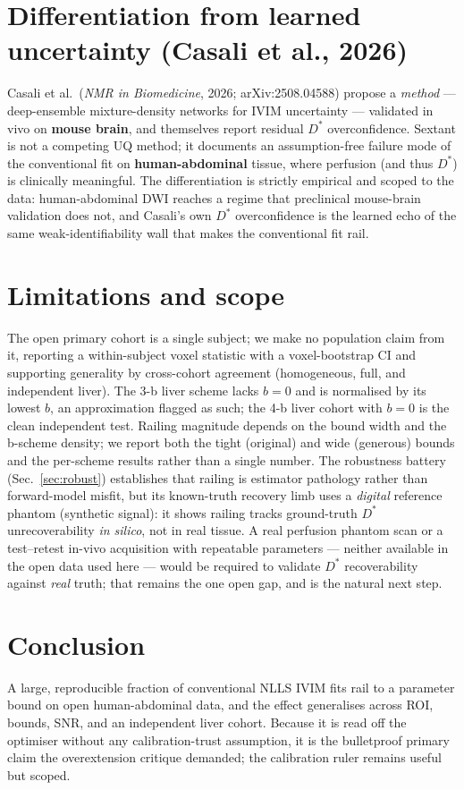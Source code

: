 \documentclass[11pt]{article}
\begin{document}
\section{Differentiation from learned uncertainty (Casali et al., 2026)}
Casali et al.\ (\emph{NMR in Biomedicine}, 2026; arXiv:2508.04588) propose a
\emph{method} --- deep-ensemble mixture-density networks for IVIM uncertainty ---
validated in vivo on \textbf{mouse brain}, and themselves report residual $D^{*}$
overconfidence. Sextant is not a competing UQ method; it documents an
assumption-free failure mode of the conventional fit on \textbf{human-abdominal}
tissue, where perfusion (and thus $D^{*}$) is clinically meaningful. The
differentiation is strictly empirical and scoped to the data: human-abdominal DWI
reaches a regime that preclinical mouse-brain validation does not, and Casali's own
$D^{*}$ overconfidence is the learned echo of the same weak-identifiability wall
that makes the conventional fit rail.

\section{Limitations and scope}
The open primary cohort is a single subject; we make no population claim from it,
reporting a within-subject voxel statistic with a voxel-bootstrap CI and supporting
generality by cross-cohort agreement (homogeneous, full, and independent liver). The
3-b liver scheme lacks $b{=}0$ and is normalised by its lowest $b$, an approximation
flagged as such; the 4-b liver cohort with $b{=}0$ is the clean independent test.
Railing magnitude depends on the bound width and the b-scheme density; we report
both the tight (original) and wide (generous) bounds and the per-scheme results
rather than a single number. The robustness battery (Sec.~\ref{sec:robust})
establishes that railing is estimator pathology rather than forward-model misfit,
but its known-truth recovery limb uses a \emph{digital} reference phantom
(synthetic signal): it shows railing tracks ground-truth $D^{*}$ unrecoverability
\emph{in silico}, not in real tissue. A real perfusion phantom scan or a
test--retest in-vivo acquisition with repeatable parameters --- neither available
in the open data used here --- would be required to validate $D^{*}$
recoverability against \emph{real} truth; that remains the one open gap, and is the
natural next step.

\section{Conclusion}
A large, reproducible fraction of conventional NLLS IVIM fits rail to a parameter
bound on open human-abdominal data, and the effect generalises across ROI, bounds,
SNR, and an independent liver cohort. Because it is read off the optimiser without
any calibration-trust assumption, it is the bulletproof primary claim the
overextension critique demanded; the calibration ruler remains useful but scoped.
\end{document}
